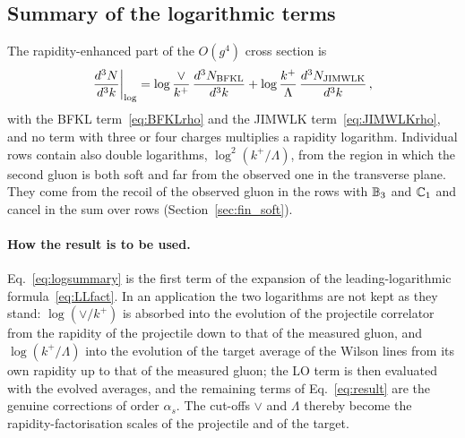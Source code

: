 \subsection{Summary of the logarithmic terms}\label{sec:logsummary}

The rapidity-enhanced part of the $O(g^4)$ cross section is
\begin{align}\label{eq:logsummary}
\frac{d^3N}{d^3k}\bigg|_{\log}=\log\frac{\vee}{k^+}\,\frac{d^3N_{\rm BFKL}}{d^3k}+\log\frac{k^+}{\Lambda}\,\frac{d^3N_{\rm JIMWLK}}{d^3k}\,,
\end{align}
with the BFKL term~\eqref{eq:BFKLrho} and the JIMWLK term~\eqref{eq:JIMWLKrho}, and no term with three or four charges multiplies a rapidity logarithm. Individual rows contain also double logarithms, $\log^2(k^+/\Lambda)$, from the region in which the second gluon is both soft and far from the observed one in the transverse plane. They come from the recoil of the observed gluon in the rows with $\mathbb{B}_3$ and $\mathbb{C}_1$ and cancel in the sum over rows (Section~\ref{sec:fin_soft}).

\paragraph{How the result is to be used.} Eq.~\eqref{eq:logsummary} is the first term of the expansion of the leading-logarithmic formula~\eqref{eq:LLfact}. In an application the two logarithms are not kept as they stand: $\log(\vee/k^+)$ is absorbed into the evolution of the projectile correlator from the rapidity of the projectile down to that of the measured gluon, and $\log(k^+/\Lambda)$ into the evolution of the target average of the Wilson lines from its own rapidity up to that of the measured gluon; the LO term is then evaluated with the evolved averages, and the remaining terms of Eq.~\eqref{eq:result} are the genuine corrections of order $\alpha_s$. The cut-offs $\vee$ and $\Lambda$ thereby become the rapidity-factorisation scales of the projectile and of the target.

